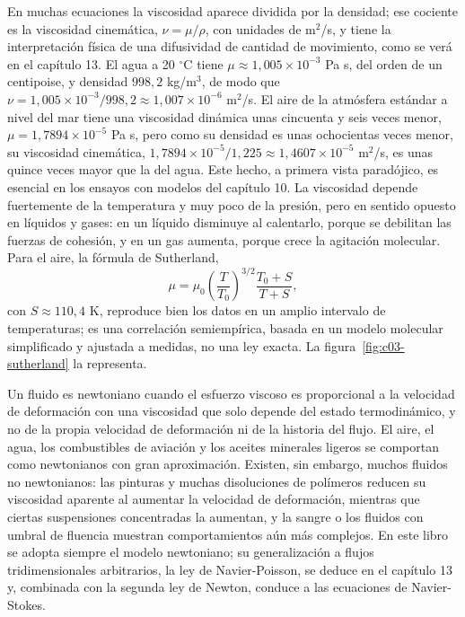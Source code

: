 \documentclass[10pt,openany]{book}
\begin{document}
En muchas ecuaciones la viscosidad aparece dividida por la densidad; ese cociente es la viscosidad cinemática, \(\nu = \mu/\rho\), con unidades de m\(^2\)/s, y tiene la interpretación física de una difusividad de cantidad de movimiento, como se verá en el capítulo 13. El agua a 20 \(^\circ\)C tiene \(\mu \approx 1{,}005\times 10^{-3}\) Pa s, del orden de un centipoise, y densidad \(998{,}2\) kg/m\(^3\), de modo que \(\nu = 1{,}005\times 10^{-3}/998{,}2 \approx 1{,}007\times 10^{-6}\) m\(^2\)/s. El aire de la atmósfera estándar a nivel del mar tiene una viscosidad dinámica unas cincuenta y seis veces menor, \(\mu = 1{,}7894\times 10^{-5}\) Pa s, pero como su densidad es unas ochocientas veces menor, su viscosidad cinemática, \(1{,}7894\times 10^{-5}/1{,}225 \approx 1{,}4607\times 10^{-5}\) m\(^2\)/s, es unas quince veces mayor que la del agua. Este hecho, a primera vista paradójico, es esencial en los ensayos con modelos del capítulo 10. La viscosidad depende fuertemente de la temperatura y muy poco de la presión, pero en sentido opuesto en líquidos y gases: en un líquido disminuye al calentarlo, porque se debilitan las fuerzas de cohesión, y en un gas aumenta, porque crece la agitación molecular. Para el aire, la fórmula de Sutherland,
\begin{equation}
\mu = \mu_0\left(\frac{T}{T_0}\right)^{3/2}\frac{T_0 + S}{T + S}, \label{eq:c03-sutherland}
\end{equation}
con \(S \approx 110{,}4\) K, reproduce bien los datos en un amplio intervalo de temperaturas; es una correlación semiempírica, basada en un modelo molecular simplificado y ajustada a medidas, no una ley exacta. La figura~\ref{fig:c03-sutherland} la representa.

Un fluido es newtoniano cuando el esfuerzo viscoso es proporcional a la velocidad de deformación con una viscosidad que solo depende del estado termodinámico, y no de la propia velocidad de deformación ni de la historia del flujo. El aire, el agua, los combustibles de aviación y los aceites minerales ligeros se comportan como newtonianos con gran aproximación. Existen, sin embargo, muchos fluidos no newtonianos: las pinturas y muchas disoluciones de polímeros reducen su viscosidad aparente al aumentar la velocidad de deformación, mientras que ciertas suspensiones concentradas la aumentan, y la sangre o los fluidos con umbral de fluencia muestran comportamientos aún más complejos. En este libro se adopta siempre el modelo newtoniano; su generalización a flujos tridimensionales arbitrarios, la ley de Navier-Poisson, se deduce en el capítulo 13 y, combinada con la segunda ley de Newton, conduce a las ecuaciones de Navier-Stokes.
\end{document}
